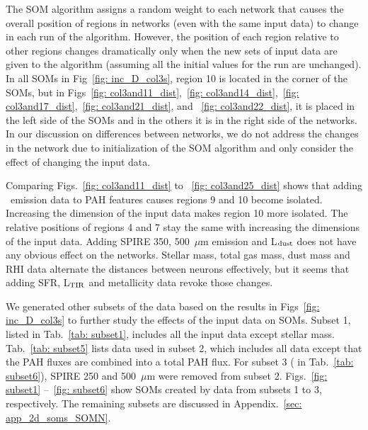             The SOM algorithm assigns a random weight to each network that causes the overall position of regions in networks (even with the same input data) to change in each run of the algorithm.
            However, the position of each region relative to other regions changes dramatically only when the new sets of input data are given to the algorithm (assuming all the initial values for the run are unchanged).
            In all SOMs in Fig~\ref{fig: inc_D_col3s}, region 10 is located in the corner of the SOMs, but in  Figs~\ref{fig: col3and11_dist},~\ref{fig: col3and14_dist},~\ref{fig: col3and17_dist},~\ref{fig: col3and21_dist}, and ~\ref{fig: col3and22_dist}, it is placed in the left side of the SOMs and in the others it is in the right side of the networks.
            In our discussion on differences between networks, we do not address the changes in the network due to initialization of the SOM algorithm and only consider the effect of changing the input data.
            
            Comparing Figs.~\ref{fig: col3and11_dist} to ~\ref{fig: col3and25_dist} shows that adding \halpha~emission data to PAH features causes regions 9 and 10 become isolated. 
            Increasing the dimension of the input data makes region 10 more isolated.
            The relative positions of regions 4 and 7 stay the same with increasing the dimensions of the input data. 
            Adding SPIRE 350, 500~$\mu$m emission and L$_{\rm dust}$ does not have any obvious effect on the networks.
            Stellar mass, total gas mass, dust mass and RHI data alternate the distances between neurons effectively, but it seems that adding SFR, L$_{\rm TIR}$ and metallicity data revoke those changes.
            
            We generated other subsets of the data based on the results in Figs~\ref{fig: inc_D_col3s} to further study the effects of the input data on SOMs.
            Subset 1, listed in Tab.~\ref{tab: subset1}, includes all the input data except stellar mass.
            Tab.~\ref{tab: subset5} lists data used in subset 2, which includes all data except that the PAH fluxes are combined into a total PAH flux. 
            For subset 3 ( in Tab.~\ref{tab: subset6}), SPIRE 250 and 500~$\mu$m were removed from subset 2.
            Figs.~\ref{fig: subset1} --~\ref{fig: subset6} show SOMs created by data from subsets 1 to 3, respectively.
            The remaining subsets are discussed in Appendix.~\ref{sec: app_2d_soms_SOMN}.


